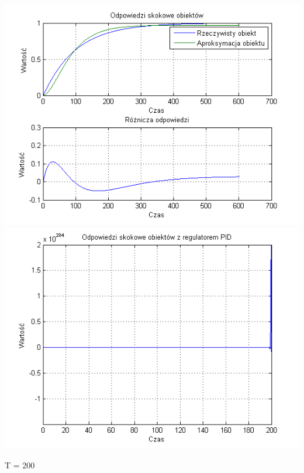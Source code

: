 \documentclass[10pt,a4paper]{article}
\begin{document}
\begin{center}
\includegraphics[scale=1]{images/dwa/skrypt_35.png}\\
\includegraphics[scale=1]{images/dwa/skrypt_36.png}\\
\end{center}
\newpage
T = 200
\end{document}
